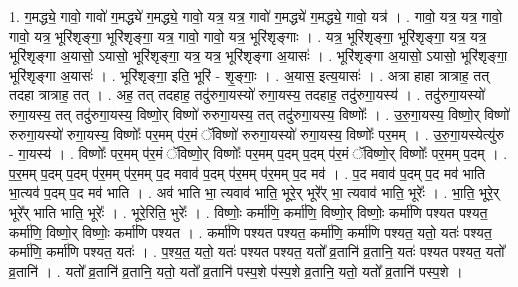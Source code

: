 \documentclass[17pt]{extarticle}
\begin{document}
1. ग॒मद्ध्ये॒ गावो॒ गावो॑ ग॒मद्ध्ये॑ ग॒मद्ध्ये॒ गावो॒ यत्र॒ यत्र॒ गावो॑ ग॒मद्ध्ये॑ ग॒मद्ध्ये॒ गावो॒ यत्र॑ । . गावो॒ यत्र॒ यत्र॒ गावो॒ गावो॒ यत्र॒ भूरि॑शृङ्गा॒ भूरि॑शृङ्गा॒ यत्र॒ गावो॒ गावो॒ यत्र॒ भूरि॑शृङ्गाः । . यत्र॒ भूरि॑शृङ्गा॒ भूरि॑शृङ्गा॒ यत्र॒ यत्र॒ भूरि॑शृङ्गा अ॒यासो॒ ऽयासो॒ भूरि॑शृङ्गा॒ यत्र॒ यत्र॒ भूरि॑शृङ्गा अ॒यासः॑ । . भूरि॑शृङ्गा अ॒यासो॒ ऽयासो॒ भूरि॑शृङ्गा॒ भूरि॑शृङ्गा अ॒यासः॑ । . भूरि॑शृङ्गा॒ इति॒ भूरि॑ - शृ॒ङ्गाः॒ । . अ॒यास॒ इत्य॒यासः॑ । . अत्रा हाहा त्रात्राह॒ तत् तदहा त्रात्राह॒ तत् । . अह॒ तत् तदहाह॒ तदु॑रुगा॒यस्यो॑ रुगा॒यस्य॒ तदहाह॒ तदु॑रुगा॒यस्य॑ । . तदु॑रुगा॒यस्यो॑ रुगा॒यस्य॒ तत् तदु॑रुगा॒यस्य॒ विष्णो॒र् विष्णो॑ रुरुगा॒यस्य॒ तत् तदु॑रुगा॒यस्य॒ विष्णोः᳚ । . उ॒रु॒गा॒यस्य॒ विष्णो॒र् विष्णो॑ रुरुगा॒यस्यो॑ रुगा॒यस्य॒ विष्णोः᳚ पर॒मम् प॑र॒मं ॅविष्णो॑ रुरुगा॒यस्यो॑ रुगा॒यस्य॒ विष्णोः᳚ पर॒मम् । . उ॒रु॒गा॒यस्येत्यु॑रु - गा॒यस्य॑ । . विष्णोः᳚ पर॒मम् प॑र॒मं ॅविष्णो॒र् विष्णोः᳚ पर॒मम् प॒दम् प॒दम् प॑र॒मं ॅविष्णो॒र् विष्णोः᳚ पर॒मम् प॒दम् । . प॒र॒मम् प॒दम् प॒दम् प॑र॒मम् प॑र॒मम् प॒द मवाव॑ प॒दम् प॑र॒मम् प॑र॒मम् प॒द मव॑ । . प॒द मवाव॑ प॒दम् प॒द मव॑ भाति भा॒त्यव॑ प॒दम् प॒द मव॑ भाति । . अव॑ भाति भा॒ त्यवाव॑ भाति॒ भूरे॒र् भूरे᳚र् भा॒ त्यवाव॑ भाति॒ भूरेः᳚ । . भा॒ति॒ भूरे॒र् भूरे᳚र् भाति भाति॒ भूरेः᳚ । . भूरे॒रिति॒ भुरेः᳚ । . विष्णोः॒ कर्मा॑णि॒ कर्मा॑णि॒ विष्णो॒र् विष्णोः॒ कर्मा॑णि पश्यत पश्यत॒ कर्मा॑णि॒ विष्णो॒र् विष्णोः॒ कर्मा॑णि पश्यत । . कर्मा॑णि पश्यत पश्यत॒ कर्मा॑णि॒ कर्मा॑णि पश्यत॒ यतो॒ यतः॑ पश्यत॒ कर्मा॑णि॒ कर्मा॑णि पश्यत॒ यतः॑ । . प॒श्य॒त॒ यतो॒ यतः॑ पश्यत पश्यत॒ यतो᳚ व्र॒तानि॑ व्र॒तानि॒ यतः॑ पश्यत पश्यत॒ यतो᳚ व्र॒तानि॑ । . यतो᳚ व्र॒तानि॑ व्र॒तानि॒ यतो॒ यतो᳚ व्र॒तानि॑ पस्प॒शे प॑स्प॒शे व्र॒तानि॒ यतो॒ यतो᳚ व्र॒तानि॑ पस्प॒शे । \newline
\end{document}
